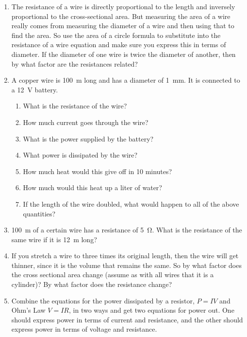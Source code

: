 \begin{enumerate}
   \item
    The resistance of a wire is directly proportional to the length and inversely proportional to the cross-sectional area. But measuring the area of a wire really comes from measuring the diameter of a wire and then using that to find the area. So use the area of a circle formula to substitute into the resistance of a wire equation and make sure you express this in terms of diameter. If the diameter of one wire is twice the diameter of another, then by what factor are the resistances related?
    
    \item
    A copper wire is \SI{100}{m} long and has a diameter of \SI{1}{mm}. It is connected to a \SI{12}{\volt} battery. 
    \begin{enumerate}
    	\setlength\itemsep{1.25 in}
    	\item What is the resistance of the wire?
    	\item How much current goes through the wire?
    	\item What is the power supplied by the battery?
        \item What power is dissipated by the wire?
        \item How much heat would this give off in 10 minutes?
        \item How much would this heat up a liter of water?
        \item If the length of the wire doubled, what would happen to all of the above quantities?
    \end{enumerate}

	\item
	\SI{100}{\meter} of a certain wire has a resistance of \SI{5}{\ohm}. What is the resistance of the same wire if it is \SI{12}{\meter} long?
	
	\item 
	If you stretch a wire to three times its original length, then the wire will get thinner, since it is the volume that remains the same. So by what factor does the cross sectional area change (assume as with all wires that it is a cylinder)? By what factor does the resistance change?
	
	\item
	Combine the equations for the power dissipated by a resistor, $P = I V$ and Ohm's Law $V = I R$, in two ways and get two equations for power out. One should express power in terms of current and resistance, and the other should express power in terms of voltage and resistance. 
	

\end{enumerate}
